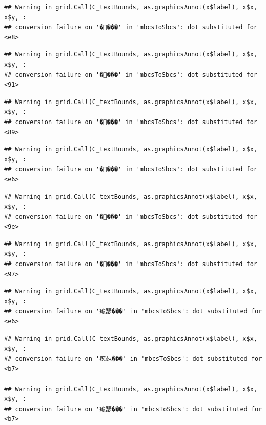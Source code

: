 \documentclass[
]{article}
\begin{document}
\begin{verbatim}
## Warning in grid.Call(C_textBounds, as.graphicsAnnot(x$label), x$x, x$y, :
## conversion failure on '����' in 'mbcsToSbcs': dot substituted for <e8>
\end{verbatim}

\begin{verbatim}
## Warning in grid.Call(C_textBounds, as.graphicsAnnot(x$label), x$x, x$y, :
## conversion failure on '����' in 'mbcsToSbcs': dot substituted for <91>
\end{verbatim}

\begin{verbatim}
## Warning in grid.Call(C_textBounds, as.graphicsAnnot(x$label), x$x, x$y, :
## conversion failure on '����' in 'mbcsToSbcs': dot substituted for <89>
\end{verbatim}

\begin{verbatim}
## Warning in grid.Call(C_textBounds, as.graphicsAnnot(x$label), x$x, x$y, :
## conversion failure on '����' in 'mbcsToSbcs': dot substituted for <e6>
\end{verbatim}

\begin{verbatim}
## Warning in grid.Call(C_textBounds, as.graphicsAnnot(x$label), x$x, x$y, :
## conversion failure on '����' in 'mbcsToSbcs': dot substituted for <9e>
\end{verbatim}

\begin{verbatim}
## Warning in grid.Call(C_textBounds, as.graphicsAnnot(x$label), x$x, x$y, :
## conversion failure on '����' in 'mbcsToSbcs': dot substituted for <97>
\end{verbatim}

\begin{verbatim}
## Warning in grid.Call(C_textBounds, as.graphicsAnnot(x$label), x$x, x$y, :
## conversion failure on '瘛瑟���' in 'mbcsToSbcs': dot substituted for <e6>
\end{verbatim}

\begin{verbatim}
## Warning in grid.Call(C_textBounds, as.graphicsAnnot(x$label), x$x, x$y, :
## conversion failure on '瘛瑟���' in 'mbcsToSbcs': dot substituted for <b7>

## Warning in grid.Call(C_textBounds, as.graphicsAnnot(x$label), x$x, x$y, :
## conversion failure on '瘛瑟���' in 'mbcsToSbcs': dot substituted for <b7>
\end{verbatim}
\end{document}
